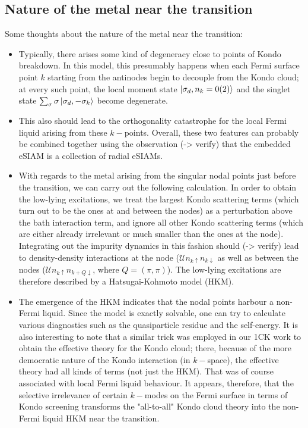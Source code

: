 \documentclass[reprint,hidelinks]{revtex4-2}
\begin{document}
\subsection{Nature of the metal near the transition}
Some thoughts about the nature of the metal near the transition:
\begin{itemize}
	\item Typically, there arises some kind of degeneracy close to points of Kondo breakdown. In this model, this presumably happens when each Fermi surface point \(k\) starting from the antinodes begin to decouple from the Kondo cloud; at every such point, the local moment state \(\ket{\sigma_d,n_k=0(2)}\) and the singlet state \(\sum_\sigma \sigma\ket{\sigma_d,-\sigma_k}\) become degenerate.
	\item This also should lead to the orthogonality catastrophe for the local Fermi liquid arising from these \(k-\)points. Overall, these two features can probably be combined together using the observation (-> verify) that the embedded eSIAM is a collection of radial eSIAMs.
	\item With regards to the metal arising from the singular nodal points just before the transition, we can carry out the following calculation. In order to obtain the low-lying excitations, we treat the largest Kondo scattering terms (which turn out to be the ones at and between the nodes) as a perturbation above the bath interaction term, and ignore all other Kondo scattering terms (which are either already irrelevant or much smaller than the ones at the node). Integrating out the impurity dynamics in this fashion should (-> verify) lead to density-density interactions at the node (\(\mathcal{U}n_{k \uparrow} n_{k \downarrow}\) as well as between the nodes (\(\mathcal{U}n_{k \uparrow} n_{{k + Q} \downarrow}\), where \(Q = \left(\pi, \pi\right) \)). The low-lying excitations are therefore described by a Hatsugai-Kohmoto model (HKM).
	\item The emergence of the HKM indicates that the nodal points harbour a non-Fermi liquid. Since the model is exactly solvable, one can try to calculate various diagnostics such as the quasiparticle residue and the self-energy. It is also interesting to note that a similar trick was employed in our 1CK work to obtain the effective theory for the Kondo cloud; there, because of the more democratic nature of the Kondo interaction (in \(k-\)space), the effective theory had all kinds of terms (not just the HKM). That was of course associated with local Fermi liquid behaviour. It appears, therefore, that the selective irrelevance of certain \(k-\)modes on the Fermi surface in terms of Kondo screening transforms the "all-to-all" Kondo cloud theory into the non-Fermi liquid HKM near the transition.
\end{itemize}
\end{document}
